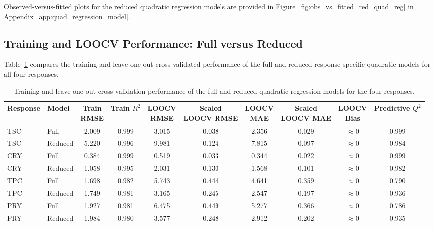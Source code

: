 \documentclass[MScDSA]{uccthesis}
\begin{document}
Observed-versus-fitted plots for the reduced quadratic regression models are provided in Figure~\ref{fig:obs_vs_fitted_red_quad_reg} in Appendix~\ref{app:quad_regression_model}.

\subsection{Training and LOOCV Performance: Full versus Reduced}
\label{sec:model_structure_comparison}
Table~\ref{tab:full_vs_reduced_quad_model_comp} compares the training and leave-one-out cross-validated performance of the full and reduced response-specific quadratic models for all four responses.

\begin{table}[H]
\centering
\fontsize{10}{12}\selectfont
\setlength{\tabcolsep}{4pt}
\caption{Training and leave-one-out cross-validation performance of the full and reduced quadratic regression models for the four responses.}
\label{tab:full_vs_reduced_quad_model_comp}
\begin{tabular}{llcccccccc}
\toprule
\textbf{Response} & \textbf{Model} & \makecell{\textbf{Train}\\\textbf{RMSE}} & \makecell{\textbf{Train}\\\textbf{$R^2$}} & 
\makecell{\textbf{LOOCV}\\\textbf{RMSE}} & \makecell{\textbf{Scaled}\\\textbf{LOOCV RMSE}} & \makecell{\textbf{LOOCV}\\\textbf{MAE}} & \makecell{\textbf{Scaled}\\\textbf{LOOCV MAE}} & \makecell{\textbf{LOOCV}\\\textbf{Bias}} & \makecell{\textbf{Predictive}\\\textbf{$Q^2$}} \\
\midrule
TSC & Full & 2.009 & 0.999 & 3.015 & 0.038 & 2.356 & 0.029 & $\approx 0$ & 0.999 \\
    TSC & Reduced & 5.220 & 0.996 & 9.981 & 0.124 & 7.815 & 0.097 & $\approx 0$ & 0.984 \\
    \midrule
    CRY & Full & 0.384 & 0.999 & 0.519 & 0.033 & 0.344 & 0.022 & $\approx 0$ & 0.999 \\
    CRY & Reduced & 1.058 & 0.995 & 2.031 & 0.130 & 1.568 & 0.101 & $\approx 0$ & 0.982 \\
    \midrule
    TPC & Full & 1.698 & 0.982 & 5.743 & 0.444 & 4.641 & 0.359 & $\approx 0$ & 0.790 \\
    TPC & Reduced & 1.749 & 0.981 & 3.165 & 0.245 & 2.547 & 0.197 & $\approx 0$ & 0.936 \\
    \midrule
    PRY & Full & 1.927 & 0.981 & 6.475 & 0.449 & 5.277 & 0.366 & $\approx 0$ & 0.786 \\
    PRY & Reduced & 1.984 & 0.980 & 3.577 & 0.248 & 2.912 & 0.202 & $\approx 0$ & 0.935 \\
\bottomrule
\end{tabular}
\end{table}
\end{document}
